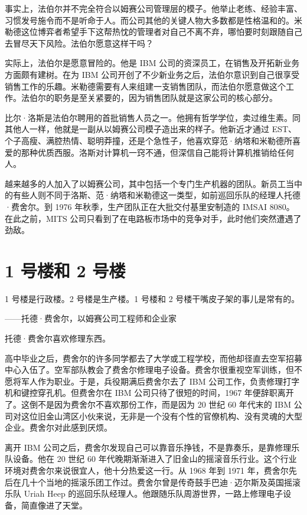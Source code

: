 \documentclass[12pt,UTF8]{ctexbook}
\begin{document}
事实上，法伯尔并不完全符合以姆赛公司管理层的模子。他举止老练、经验丰富、习惯发号施令而不是听命于人。而公司其他的关键人物大多数都是性格温和的。米勒德这位博弈者希望手下这帮热忱的管理者对自己不离不弃，哪怕要时刻跟随自己去冒尽天下风险。法伯尔愿意这样干吗？

实际上，法伯尔是愿意冒险的。他是 IBM 公司的资深员工，在销售及开拓新业务方面颇有建树。在为 IBM 公司开创了不少新业务之后，法伯尔意识到自己很享受销售工作的乐趣。米勒德需要有人来组建一支销售团队，而法伯尔愿意做这个工作。法伯尔的职务是至关紧要的，因为销售团队就是这家公司的核心部分。

比尔·洛斯是法伯尔聘用的首批销售人员之一。他拥有哲学学位，卖过维生素。同其他人一样，他就是一副从以姆赛公司模子造出来的样子。他新近才通过 EST、个子高瘦、满腔热情、聪明莽撞，还是个急性子，他喜欢穿范·纳塔和米勒德所喜爱的那种优质西服。洛斯对计算机一窍不通，但深信自己能将计算机推销给任何人。

越来越多的人加入了以姆赛公司，其中包括一个专门生产机器的团队。新员工当中的有些人则不同于洛斯、范·纳塔和米勒德这一类型，如前巡回乐队的经理人托德·费舍尔。到 1976 年秋季，生产团队正在大批交付基里安制造的 IMSAI 8080。在此之前，MITS 公司只看到了在电路板市场中的竞争对手，此时他们突然遭遇了劲敌。





\section{1 号楼和 2 号楼}


1 号楼是行政楼。2 号楼是生产楼。1 号楼和 2 号楼干嘴皮子架的事儿是常有的。

——托德·费舍尔，以姆赛公司工程师和企业家



托德·费舍尔喜欢修理东西。

高中毕业之后，费舍尔的许多同学都去了大学或工程学校，而他却径直去空军招募中心入伍了。空军部队教会了费舍尔修理电子设备。费舍尔很重视空军训练，但不愿将军人作为职业。于是，兵役期满后费舍尔去了 IBM 公司工作，负责修理打字机和键控穿孔机。但费舍尔在 IBM 公司只待了很短的时间，1967 年便辞职离开了。这倒不是因为费舍尔不喜欢那份工作，而是因为 20 世纪 60 年代末的 IBM 公司对这位旧金山湾区小伙来说，无非是一个没有个性的官僚机构、没有灵魂的大型企业。费舍尔对此感到厌烦。

离开 IBM 公司之后，费舍尔发现自己可以靠音乐挣钱，不是靠奏乐，是靠修理乐队设备。他在 20 世纪 60 年代晚期渐渐进入了旧金山的摇滚音乐行业。这个行业环境对费舍尔来说很宜人，他十分热爱这一行。从 1968 年到 1971 年，费舍尔先后在几十个当地的摇滚乐团工作过。费舍尔曾是传奇鼓手巴迪·迈尔斯及英国摇滚乐队 Uriah Heep 的巡回乐队经理人。他跟随乐队周游世界，一路上修理电子设备，简直像进了天堂。
\end{document}
